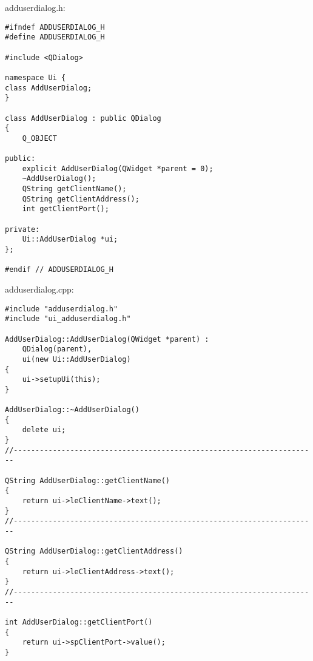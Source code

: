 adduserdialog.h:

\begin{lstlisting}
#ifndef ADDUSERDIALOG_H
#define ADDUSERDIALOG_H

#include <QDialog>

namespace Ui {
class AddUserDialog;
}

class AddUserDialog : public QDialog
{
    Q_OBJECT

public:
    explicit AddUserDialog(QWidget *parent = 0);
    ~AddUserDialog();
    QString getClientName();
    QString getClientAddress();
    int getClientPort();

private:
    Ui::AddUserDialog *ui;
};

#endif // ADDUSERDIALOG_H
\end{lstlisting}

adduserdialog.cpp:

\begin{lstlisting}
#include "adduserdialog.h"
#include "ui_adduserdialog.h"

AddUserDialog::AddUserDialog(QWidget *parent) :
    QDialog(parent),
    ui(new Ui::AddUserDialog)
{
    ui->setupUi(this);
}

AddUserDialog::~AddUserDialog()
{
    delete ui;
}
//----------------------------------------------------------------------

QString AddUserDialog::getClientName()
{
    return ui->leClientName->text();
}
//----------------------------------------------------------------------

QString AddUserDialog::getClientAddress()
{
    return ui->leClientAddress->text();
}
//----------------------------------------------------------------------

int AddUserDialog::getClientPort()
{
    return ui->spClientPort->value();
}
\end{lstlisting}
